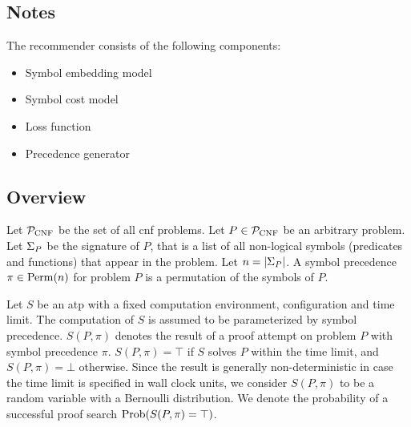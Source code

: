 
\subsection{Notes}

The recommender consists of the following components:

\begin{itemize}
\item Symbol embedding model
\item Symbol cost model
\item Loss function
\item Precedence generator
\end{itemize}

\newcommand{\Prec}{\pi}
\newcommand{\PrecBetter}{\pi}
\newcommand{\PrecWorse}{\rho}

\subsection{Overview}

Let $\operatorname{\mathcal{P}_{\mathrm{CNF}}}$ be the set of all \gls{cnf} problems.
Let $P \in \operatorname{\mathcal{P}_{\mathrm{CNF}}}$ be an arbitrary problem.
Let $\Sigma_P$ be the signature of $P$, that is a list of all non-logical symbols (predicates and functions)
that appear in the problem.
Let $n = \left|\Sigma_P\right|$.
A symbol precedence $\Prec \in \Perm{n}$ for problem $P$ is a permutation of the symbols of $P$.

\newcommand{\Solver}{S}
\newcommand{\SolverRun}[2]{\Solver(#1, #2)}

Let $\Solver$ be an \gls{atp} with a fixed computation environment, configuration and time limit.
The computation of $\Solver$ is assumed to be parameterized by symbol precedence.
$\SolverRun{P}{\Prec}$ denotes the result of a proof attempt on problem $P$ with symbol precedence $\Prec$.
$\SolverRun{P}{\Prec} = \top$ if $S$ solves $P$ within the time limit, and $\SolverRun{P}{\Prec} = \bot$ otherwise.
Since the result is generally non-deterministic in case the time limit is specified in wall clock units,
we consider $\SolverRun{P}{\Prec}$ to be a random variable with a Bernoulli distribution.
We denote the probability of a successful proof search $\Prob{\SolverRun{P}{\Prec} = \top}$.

